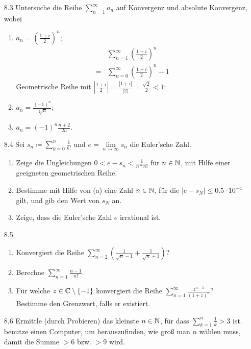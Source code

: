 \documentclass{HM}
\begin{document}
\begin{enumerate}
\item[8.3] Untersuche die Reihe $\sum\limits_{n=1}^\infty a_n$ auf Konvergenz und absolute Konvergenz, wobei\\
\begin{enumerate}
\item $a_n=\left(\frac{1+i}{2}\right)^n$;
\begin{align*}
 &\sum\limits_{n=1}^\infty\left(\frac{1+i}{2}\right)^n\\
=&\sum\limits_{n=0}^\infty\left(\frac{1+i}{2}\right)^n-1
\end{align*}
Geometrische Reihe mit $|\frac{1+i}{2}| = \frac{|1+i|}{|2|} = \frac{\sqrt{2}}{2} < 1$:\\

\item $a_n=\frac{(-1)^n}{\sqrt[3]{n}}$;
\item $a_n=(-1)^n\frac{n+2}{2n}$.
\end{enumerate}
\item[8.4] Sei $s_n\coloneqq \sum\limits_{k=0}^n\frac{1}{k!}$ und $e=\lim\limits_{n\to\infty}s_n$ die Euler'sche Zahl.
\begin{enumerate}
\item Zeige die Ungleichungen $0<e-s_n<\frac{1}{n*n!}$ für $n\in\mathbb{N}$, mit Hilfe einer geeigneten geometrischen Reihe.
\item Bestimme mit Hilfe von (a) eine Zahl $n\in\mathbb{N}$, für die $|e-s_N|\leq 0.5\cdot 10^{-4}$ gilt, und gib den Wert von $s_N$ an.
\item Zeige, dass die Euler'sche Zahl $e$ irrational ist.
\end{enumerate}
\item[8.5]
\begin{enumerate}
\item Konvergiert die Reihe $\sum\limits_{n=2}^\infty\left(\frac{1}{\sqrt{n}-1}+\frac{1}{\sqrt{n}+1}\right)$?
\item Berechne $\sum\limits_{n=1}^\infty\frac{n-1}{n!}$.
\item Für welche $z\in\mathbb{C}\setminus\lbrace-1\rbrace$ konvergiert die Reihe $\sum\limits_{n=1}^\infty\frac{z^{n-1}}{(1+z)^n}?$\\
Bestimme den Grenzwert, falls er existiert.
\end{enumerate}
\item[8.6] Ermittle (durch Probieren) das kleinste $n\in\mathbb{N}$, für dass $\sum\limits_{k=1}^n\frac{1}{k}>3$ ist. benutze einen Computer, um herauszufinden, wie groß man $n$ wählen muss, damit die Summe $>6$ bzw. $>9$ wird.
\end{enumerate}
\end{document}
